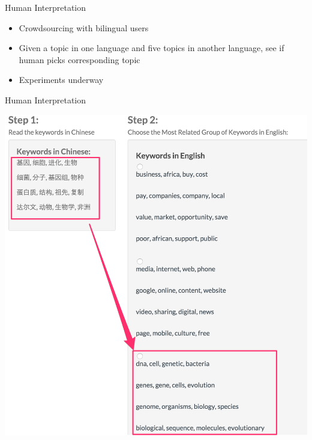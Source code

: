 \documentclass[compress]{beamer}
\begin{document}
		\begin{frame}{Human Interpretation}
			\begin{itemize}
				\item Crowdsourcing with bilingual users
				\item Given a topic in one language
                                  and five topics in another language,
                                  see if human picks corresponding topic
				\item Experiments underway
			\end{itemize}
		\end{frame}
		\begin{frame}{Human Interpretation}
			\begin{center}
				\includegraphics[height=0.8\textheight]{multilingual_itm/crowdflower.png}
			\end{center}
		\end{frame}
\end{document}
